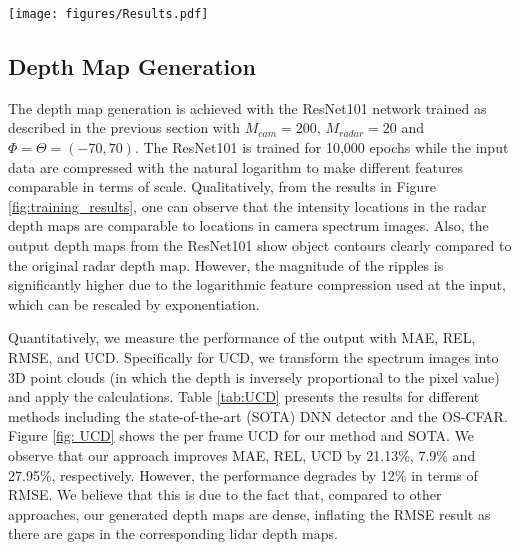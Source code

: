 \begin{figure*}[t!]
  \centering
  \texttt{[image: figures/Results.pdf]}
  \caption{Results from the training module for four example frames. From left to right for each example frame: Scene in RGB, Camera spatial spectrum ($\textbf{P}_{cam}$), original radar depth map, output from trained ResNet101. In each of the 4 frames, observe that our approach leads to sharper depth maps.}
  \vspace{-11px}
  \label{fig:training_results}
  \centering
  \vspace{-6px}
\end{figure*}

\subsection{Depth Map Generation}
The depth map generation is achieved with the ResNet101 network trained as described in the previous section with $M_{cam}=200$, $M_{radar}=20$ and $\Phi=\Theta=(-70,70)$. The ResNet101 is trained for 10,000 epochs while the input data are compressed with the natural logarithm to make different features comparable in terms of scale. Qualitatively, from the results in Figure \ref{fig:training_results}, one can observe that the intensity locations in the radar depth maps are comparable to locations in camera spectrum images. Also, the output depth maps from the ResNet101 show object contours clearly compared to the original radar depth map. However, the magnitude of the ripples is significantly higher due to the logarithmic feature compression used at the input, which can be rescaled by exponentiation.
\par Quantitatively, we measure the performance of the output with MAE, REL, RMSE, and UCD. Specifically for UCD, we transform the spectrum images into 3D point clouds (in which the depth is inversely proportional to the pixel value) and apply the calculations. Table \ref{tab:UCD} presents the results for different methods including the state-of-the-art (SOTA) DNN detector \cite{roldan2024see} and the OS-CFAR. Figure \ref{fig: UCD} shows the per frame UCD for our method and SOTA. We observe that our approach improves MAE, REL, UCD by 21.13\%, 7.9\% and 27.95\%, respectively. However, the performance degrades by 12\% in terms of RMSE. We believe that this is due to the fact that, compared to other approaches, our generated depth maps are dense, inflating the RMSE result as there are gaps in the corresponding lidar depth maps.

